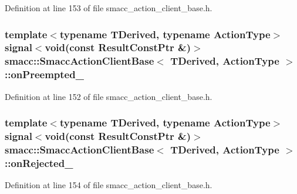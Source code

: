 Definition at line 153 of file smacc\+\_\+action\+\_\+client\+\_\+base.\+h.

\subsubsection[{\texorpdfstring{on\+Preempted\+\_\+}{onPreempted_}}]{\setlength{\rightskip}{0pt plus 5cm}template$<$typename T\+Derived, typename Action\+Type$>$ signal$<$void(const Result\+Const\+Ptr \&)$>$ {\bf smacc\+::\+Smacc\+Action\+Client\+Base}$<$ T\+Derived, Action\+Type $>$\+::on\+Preempted\+\_\+\hspace{0.3cm}{\ttfamily [protected]}}\hypertarget{classsmacc_1_1SmaccActionClientBase_afa8833dad78e3e3991cfec0e396b24c9}{}\label{classsmacc_1_1SmaccActionClientBase_afa8833dad78e3e3991cfec0e396b24c9}


Definition at line 152 of file smacc\+\_\+action\+\_\+client\+\_\+base.\+h.

\subsubsection[{\texorpdfstring{on\+Rejected\+\_\+}{onRejected_}}]{\setlength{\rightskip}{0pt plus 5cm}template$<$typename T\+Derived, typename Action\+Type$>$ signal$<$void(const Result\+Const\+Ptr \&)$>$ {\bf smacc\+::\+Smacc\+Action\+Client\+Base}$<$ T\+Derived, Action\+Type $>$\+::on\+Rejected\+\_\+\hspace{0.3cm}{\ttfamily [protected]}}\hypertarget{classsmacc_1_1SmaccActionClientBase_a729484addba07d0eaf253f22456615fd}{}\label{classsmacc_1_1SmaccActionClientBase_a729484addba07d0eaf253f22456615fd}


Definition at line 154 of file smacc\+\_\+action\+\_\+client\+\_\+base.\+h.


